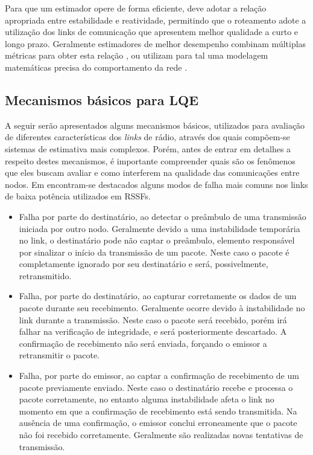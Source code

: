 \documentclass[
	12pt,				%
	openright,			%
	oneside,
	a4paper,			%
	english,			%
	french,				%
	spanish,			%
	brazil				%
	]{abntex2}
\begin{document}
Para que um estimador opere de forma eficiente, deve adotar a relação apropriada entre estabilidade e reatividade, permitindo que o roteamento adote a utilização dos links de comunicação que apresentem melhor qualidade a curto e longo prazo. Geralmente estimadores de melhor desempenho combinam múltiplas métricas para obter esta relação \cite{Sang2010}, ou utilizam para tal uma modelagem matemáticas precisa do comportamento da rede \cite{Woo2003}.

\subsection{Mecanismos básicos para LQE}

A seguir serão apresentados alguns mecanismos básicos, utilizados para avaliação de diferentes características dos \textit{links} de rádio, através dos quais compõem-se sistemas de estimativa mais complexos. Porém, antes de entrar em detalhes a respeito destes mecanismos, é importante compreender quais são os fenômenos que eles buscam avaliar e como interferem na qualidade das comunicações entre nodos. Em \cite{Kusy2011} encontram-se destacados alguns modos de falha mais comuns nos links de baixa potência utilizados em RSSFs.

\begin{itemize}
	\item Falha por parte do destinatário, ao detectar o preâmbulo de uma transmissão iniciada por outro nodo. Geralmente devido a uma instabilidade temporária no link, o destinatário pode não captar o preâmbulo, elemento responsável por sinalizar o início da transmissão de um pacote. Neste caso o pacote é completamente ignorado por seu destinatário e será, possivelmente, retransmitido.
	\item Falha, por parte do destinatário, ao capturar corretamente os dados de um pacote durante seu recebimento. Geralmente ocorre devido à instabilidade no link durante a transmissão. Neste caso o pacote será recebido, porém irá falhar na verificação de integridade, e será posteriormente descartado. A confirmação de recebimento não será enviada, forçando o emissor a retransmitir o pacote.
	\item Falha, por parte do emissor, ao captar a confirmação de recebimento de um pacote previamente enviado. Neste caso o destinatário recebe e processa o pacote corretamente, no entanto alguma instabilidade afeta o link no momento em que a confirmação de recebimento está sendo transmitida. Na ausência de uma confirmação, o emissor conclui erroneamente que o pacote não foi recebido corretamente. Geralmente são realizadas novas tentativas de transmissão.
\end{itemize}
\end{document}
